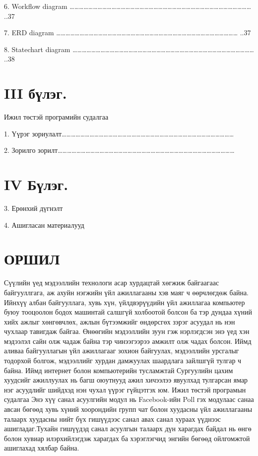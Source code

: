 \documentclass[12pt]{article}
\begin{document}
               6.   Workflow diagram
               ………………………………………………………………………………………………………                  
                ..37
                
               7.   ERD diagram
               ………………………………………………………………………………………………………                  
                ..37
                
               8. Statechart diagram
               ………………………………………………………………………………………………………                  
               ..38
               
                
                
               
\section     {III бүлэг.} Ижил төстэй програмийн судалгаа

               1.   Үүрэг зориулалт…………………………………………………………………………………………………  
               
               2.   Зорилго зорилт……………………………………………………………………………………………………
                   
               
\section     {IV Бүлэг.} 
    
               3.	Ерөнхий дүгнэлт
               
               4.	Ашигласан материалууд    
        
                 



	
	\section                            {ОРШИЛ}
	
	Сүүлийн үед мэдээллийн технологи асар хурдацтай хөгжиж байгаагаас байгууллгага, аж ахуйн нэгжийн үйл ажиллагааны хэв маяг ч өөрчлөгдөж байна. 
	Ийнхүү албан байгууллага, хувь хүн, үйлдвэрүүдийн үйл ажиллагаа компьютер буюу тооцоолон бодох машинтай салшгүй холбоотой болсон ба тэр дундаа хүний хийх ажлыг хөнгөвчлөх, ажлын бүтээмжийг өндөрсгөх зэрэг асуудал нь нэн чухлаар тавигдаж байгаа. 
	Өнөөгийн мэдээллийн зуун гэж нэрлэгдсэн энэ үед хэн мэдээлэл сайн олж чадаж байна тэр чинээгээрээ амжилт олж чадах болсон. Иймд аливаа байгууллагын үйл ажиллагааг зохион байгуулах, мэдээллийн урсгалыг тодорхой болгож, мэдээллийг хурдан дамжуулах шаардлага зайлшгүй тулгар ч байна. Иймд интернет болон компьютерийн тусламжтай Сургуулийн цахим хуудсийг ажиллуулах нь багш оюутнууд ажил хичээлээ явуулхад тулгарсан ямар нэг асуудлийг шийдхэд нэн чухал үүрэг гүйцэтгэх юм.
	Ижил төстэй програмын судалгаа
	Энэ хүү санал асуулгийн модул нь Facebook-ийн Poll гэх модулаас санаа авсан бөгөөд хувь хүний хоорондийн групп чат болон хуудасны үйл ажиллагааны талаарх хуудасны нийт бүх гишүүдээс санал авах санал хураах үүднээс ашигладаг.Тухайн гишүүдэд санал асуулгын талаарх дүн харагдах байдал нь өнгө болон  хувиар илэрхийлэгдэж харагдах ба хэрэглэгчид энгийн бөгөөд ойлгомжтой ашиглахад хялбар байна. 
	
\end{document}

